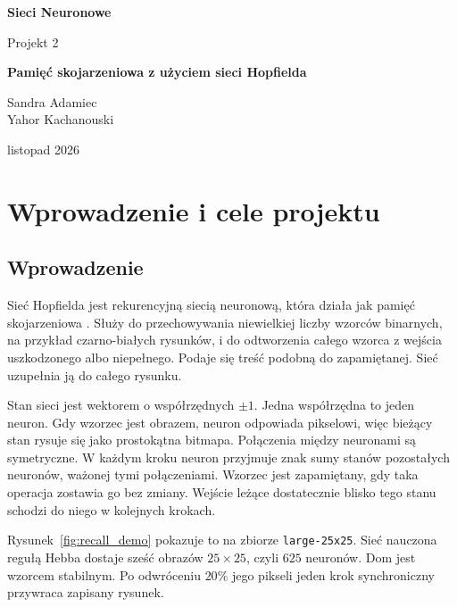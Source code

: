 \documentclass[11pt,a4paper]{article}
\begin{document}
\begin{titlepage}
    \centering
    {\fontsize{60}{30}\selectfont \textbf{Sieci Neuronowe} \par}
    \vspace{1.5cm}
    {\fontsize{30}{20}\selectfont Projekt 2 \par}
    \vspace{5cm}
    {\fontsize{36}{20}\selectfont \textbf{Pamięć skojarzeniowa z użyciem sieci Hopfielda} \par}
    \vspace{7.5cm}

    {\fontsize{26}{20}\selectfont
    Sandra Adamiec\\
    Yahor Kachanouski
    \par}
    \vspace{0.5cm}
    \vfill

    {\large listopad 2026 \par}

\end{titlepage}

\tableofcontents
\newpage

\section{Wprowadzenie i cele projektu}

\subsection{Wprowadzenie}
Sieć Hopfielda jest rekurencyjną siecią neuronową, która działa jak pamięć skojarzeniowa \cite{hopfield1982}. Służy do przechowywania niewielkiej liczby wzorców binarnych, na przykład czarno-białych rysunków, i do odtworzenia całego wzorca z wejścia uszkodzonego albo niepełnego. Podaje się treść podobną do zapamiętanej. Sieć uzupełnia ją do całego rysunku.

Stan sieci jest wektorem o współrzędnych \(\pm 1\). Jedna współrzędna to jeden neuron. Gdy wzorzec jest obrazem, neuron odpowiada pikselowi, więc bieżący stan rysuje się jako prostokątna bitmapa. Połączenia między neuronami są symetryczne. W każdym kroku neuron przyjmuje znak sumy stanów pozostałych neuronów, ważonej tymi połączeniami. Wzorzec jest zapamiętany, gdy taka operacja zostawia go bez zmiany. Wejście leżące dostatecznie blisko tego stanu schodzi do niego w kolejnych krokach.

Rysunek~\ref{fig:recall_demo} pokazuje to na zbiorze \texttt{large-25x25}. Sieć nauczona regułą Hebba dostaje sześć obrazów \(25\times 25\), czyli \(625\) neuronów. Dom jest wzorcem stabilnym. Po odwróceniu \(20\%\) jego pikseli jeden krok synchroniczny przywraca zapisany rysunek.
\end{document}
